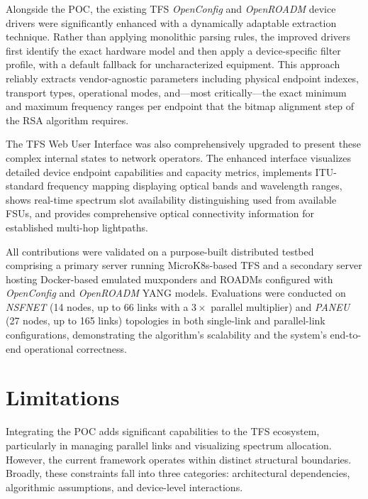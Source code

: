 \documentclass[12pt, a4paper, twoside, openright]{report}
\begin{document}
Alongside the POC, the existing TFS \emph{OpenConfig} and \emph{OpenROADM} device drivers were significantly enhanced with a dynamically adaptable extraction technique. Rather than applying monolithic parsing rules, the improved drivers first identify the exact hardware model and then apply a device-specific filter profile, with a default fallback for uncharacterized equipment. This approach reliably extracts vendor-agnostic parameters including physical endpoint indexes, transport types, operational modes, and---most critically---the exact minimum and maximum frequency ranges per endpoint that the bitmap alignment step of the RSA algorithm requires.

The TFS Web User Interface was also comprehensively upgraded to present these complex internal states to network operators. The enhanced interface visualizes detailed device endpoint capabilities and capacity metrics, implements ITU-standard frequency mapping displaying optical bands and wavelength ranges, shows real-time spectrum slot availability distinguishing used from available FSUs, and provides comprehensive optical connectivity information for established multi-hop lightpaths.

All contributions were validated on a purpose-built distributed testbed comprising a primary server running MicroK8s-based TFS and a secondary server hosting Docker-based emulated muxponders and ROADMs configured with \emph{OpenConfig} and \emph{OpenROADM} YANG models. Evaluations were conducted on \emph{NSFNET} (14 nodes, up to 66 links with a $3\times$ parallel multiplier) and \emph{PANEU} (27 nodes, up to 165 links) topologies in both single-link and parallel-link configurations, demonstrating the algorithm's scalability and the system's end-to-end operational correctness.
\section{Limitations}
Integrating the POC adds significant capabilities to the TFS ecosystem, particularly in managing parallel links and visualizing spectrum allocation. However, the current framework operates within distinct structural boundaries. Broadly, these constraints fall into three categories: architectural dependencies, algorithmic assumptions, and device-level interactions.
\end{document}
